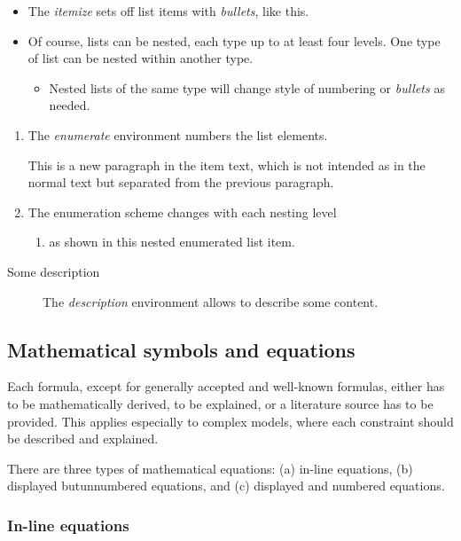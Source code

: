 \begin{itemize}
\item 
The \emph{itemize} sets off list items with \emph{bullets}, like this.
%
\item Of course, lists can be nested, each type up to at least four levels.
One type of list can be nested within another type.
%
  \begin{itemize}
  \item Nested lists of the same type will change style of numbering 
  or \emph{bullets} as needed.
  \end{itemize}
\end{itemize}
%
\begin{enumerate}
\item The \emph{enumerate} environment numbers the list elements.

This is a new paragraph in the item text, which is not intended as in the normal text but separated from the previous paragraph.
%
\item The enumeration scheme changes with each nesting level
  \begin{enumerate}
  \item as shown in this nested enumerated list item.
  \end{enumerate}
\end{enumerate} 

\begin{description}
\item[Some description] The \emph{description} environment allows to describe some content.
\end{description}

\subsection*{Mathematical symbols and equations}
\label{sec:math}

Each formula, except for generally accepted and well-known formulas, either has to be mathematically derived, to be explained, or a literature source has to be provided. This applies especially to complex models, where each constraint should be described and explained.

There are three types of mathematical equations: (a) in-line equations, (b) displayed butunnumbered equations, and (c) displayed and numbered equations.

\subsubsection*{In-line equations}
\label{sec:inlineeq}


